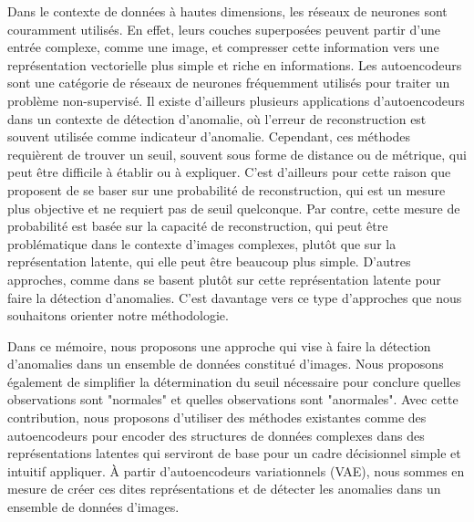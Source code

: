 Dans le contexte de données à hautes dimensions, les réseaux de neurones sont couramment utilisés. En effet, leurs couches superposées peuvent partir d'une entrée complexe, comme une image, et compresser cette information vers une représentation vectorielle plus simple et riche en informations. Les autoencodeurs sont une catégorie de réseaux de neurones fréquemment utilisés pour traiter un problème non-supervisé. Il existe d'ailleurs plusieurs applications d'autoencodeurs dans un contexte de détection d'anomalie, où l'erreur de reconstruction est souvent utilisée comme indicateur d'anomalie. Cependant, ces méthodes requièrent de trouver un seuil, souvent sous forme de distance ou de métrique, qui peut être difficile à établir ou à expliquer. C'est d'ailleurs pour cette raison que  \cite{An2015VariationalAB} proposent de se baser sur une probabilité de reconstruction, qui est un mesure plus objective et ne requiert pas de seuil quelconque. Par contre, cette mesure de probabilité est basée sur la capacité de reconstruction, qui peut être problématique dans le contexte d'images complexes, plutôt que sur la représentation latente, qui elle peut être beaucoup plus simple. D'autres approches, comme dans \cite{DBLP:journals/corr/abs-1802-06360} se basent plutôt sur cette représentation latente pour faire la détection d'anomalies. C'est davantage vers ce type d'approches que nous souhaitons orienter notre méthodologie. 

Dans ce mémoire, nous proposons une approche qui vise à faire la détection d'anomalies dans un ensemble de données constitué d'images. Nous proposons également de simplifier la détermination du seuil nécessaire pour conclure quelles observations sont "normales" et quelles observations sont "anormales". Avec cette contribution, nous proposons d'utiliser des méthodes existantes comme des autoencodeurs  pour encoder des structures de données complexes dans des représentations latentes qui serviront de base pour un cadre décisionnel simple et intuitif appliquer. À partir d'autoencodeurs variationnels (VAE), nous sommes en mesure de créer ces dites représentations et de détecter les anomalies dans un ensemble de données d'images.
